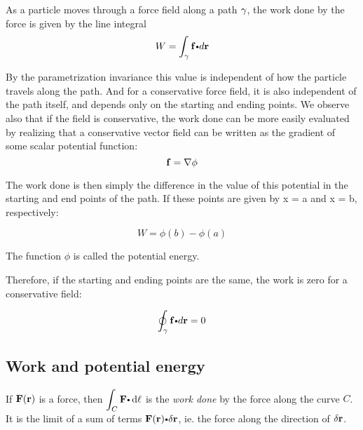 As a particle moves through a force field along a path $\gamma$, the
work done by the force is given by the  line integral
\[W = \dint_\caminho \funvect{f} \bp d\vector{r}\]

By the parametrization invariance this value is independent of how the particle travels along the path. 
And for a conservative force field, it is also independent of the path itself, and depends only on the starting and
ending points.
We observe also that if the field is conservative, the
work done can be more easily evaluated by realizing that a conservative
vector field can be written as the gradient of some scalar potential
function:
\[\mathbf{ f} = \nabla \phi\]

The work done is then simply the difference in the value of this
potential in the starting and end points of the path. If these points
are given by x = a and x = b, respectively:

\[W = \phi(b) - \phi(a)\]

The function $\phi$ is called the potential energy.

Therefore, if the starting and ending points are the
same, the work is zero for a conservative field:

\[\doint_\caminho \funvect{f} \bp d\vector{r} = 0\] 



% 
% 
% 
% 

  \subsection{Work and potential energy}
\begin{df}
  If $\mathbf{ F}(\mathbf{ r})$ is a force, then $\dint_C \vector{F}\bp \d \ell$ is the \emph{work done} by the force along the curve $C$. It is the limit of a sum of terms $\vector{F}(\vector{r})\bp \delta \vector{r}$, ie. the force along the direction of $\delta \mathbf{ r}$.
\end{df}

